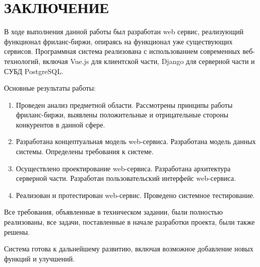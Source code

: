 \section*{ЗАКЛЮЧЕНИЕ}

В ходе выполнения данной работы был разработан web сервис, реализующий функционал фриланс-биржи, опираясь на функционал уже существующих сервисов. Программная система реализована с использованием современных веб-технологий, включая Vue.js для клиентской части, Django для серверной части и СУБД PostgreSQL.

Основные результаты работы:

\begin{enumerate}
\item Проведен анализ предметной области. Рассмотрены принципы работы фриланс-биржи, выявлены положительные и отрицательные стороны конкурентов в данной сфере.
\item Разработана концептуальная модель web-сервиса. Разработана модель данных системы. Определены требования к системе.
\item Осуществлено проектирование web-сервиса. Разработана архитектура серверной части. Разработан пользовательский интерфейс web-сервиса.
\item Реализован и протестирован web-сервис. Проведено системное тестирование.
\end{enumerate}

Все требования, объявленные в техническом задании, были полностью реализованы, все задачи, поставленные в начале разработки проекта, были также решены.

Система готова к дальнейшему развитию, включая возможное добавление новых функций и улучшений.  
